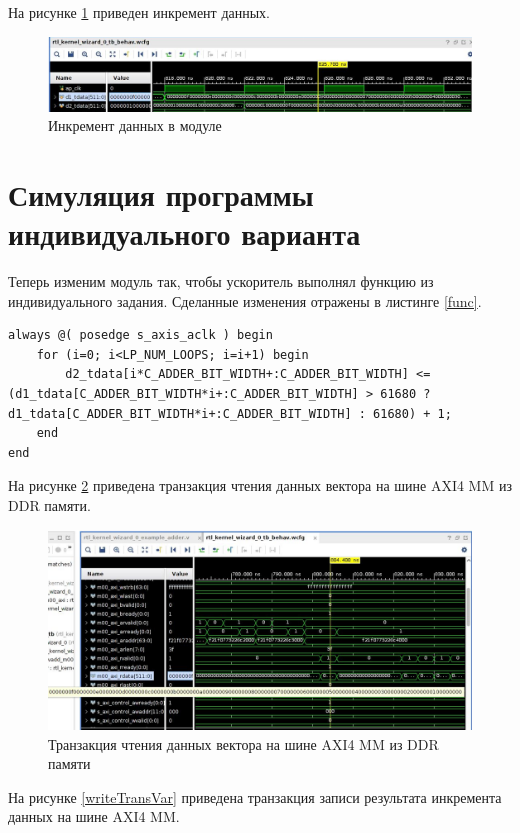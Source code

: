 На рисунке \ref{incTr} приведен инкремент данных. 

\begin{figure}[h!p]
	\centering
	\includegraphics[width = \linewidth]{inc/inc.png}
	\caption{Инкремент данных в модуле}
	\label{incTr}
\end{figure}
\newpage
\section{Симуляция программы индивидуального варианта}
Теперь изменим модуль так, чтобы ускоритель выполнял функцию из индивидуального задания. Сделанные изменения отражены в листинге \ref{func}.
\begin{lstlisting}[label=func,caption=Модифицированная функция]
always @( posedge s_axis_aclk ) begin
    for (i=0; i<LP_NUM_LOOPS; i=i+1) begin
        d2_tdata[i*C_ADDER_BIT_WIDTH+:C_ADDER_BIT_WIDTH] <= (d1_tdata[C_ADDER_BIT_WIDTH*i+:C_ADDER_BIT_WIDTH] > 61680 ? d1_tdata[C_ADDER_BIT_WIDTH*i+:C_ADDER_BIT_WIDTH] : 61680) + 1;
    end
end
\end{lstlisting}

На рисунке \ref{readTransVar} приведена транзакция чтения данных вектора на шине AXI4 MM из DDR памяти.

\begin{figure}[h!p]
	\centering
	\includegraphics[width = \linewidth]{inc/read_var.png}
	\caption{Транзакция чтения данных вектора на шине AXI4 MM из DDR памяти}
	\label{readTransVar}
\end{figure}
\newpage
На рисунке \ref{writeTransVar} приведена транзакция записи результата инкремента данных на шине AXI4 MM.


